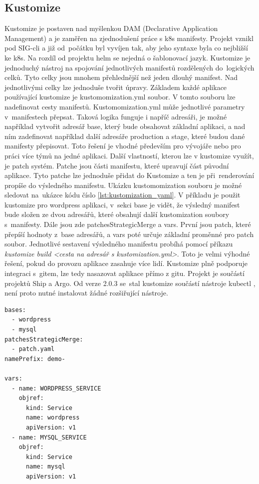 \subsection{Kustomize}
Kustomize je postaven nad myšlenkou DAM (Declarative Application Management) \cite{k8s_DAM} a je zaměřen na zjednodušení práce s k8s manifesty. Projekt vznikl pod SIG-cli \cite{kustomize_sig} a již od počátku byl vyvíjen tak, aby jeho syntaxe byla co nejbližší ke k8s. Na rozdíl od projektu helm se nejedná o šablonovací jazyk. Kustomize je jednoduchý nástroj na spojování jednotlivých manifestů rozdělených do logických celků. Tyto celky jsou mnohem přehlednější než jeden dlouhý manifest. Nad jednotlivými celky lze jednoduše tvořit úpravy. Základem každé aplikace používající kustomize je kustomomization.yml soubor. V tomto souboru lze nadefinovat cesty manifestů. Kustomomization.yml může jednotlivé parametry v manifestech přepsat. Taková logika funguje i napříč adresáři, je možné například vytvořit adresář base, který bude obsahovat základní aplikaci, a nad ním zadefinovat například další adresáře production a stage, které budou dané manifesty přepisovat. Toto řešení je vhodné především pro vývojáře nebo pro práci více týmů na jedné aplikaci. Další vlastností, kterou lze v kustomize využít, je patch systém. Patche jsou části manifestu, které upravují část původní aplikace. Tyto patche lze jednoduše přidat do Kustomize a ten je při renderování propíše do výsledného manifestu. Ukázku kustomomization souboru je možné sledovat na ukázce kódu číslo \ref{lst:kustomization_yaml}. V příkladu je použit kustomize pro wordpress aplikaci, v sekci base je vidět, že výsledný manifest bude složen ze dvou adresářů, které obsahují další kustomization soubory s manifesty. Dále jsou zde patchesStrategicMerge a vars. První jsou patch, které přepíší hodnoty z base adresářů, a vars poté určuje základní proměnné pro patch soubor. Jednotlivé sestavení výsledného manifestu probíhá pomocí příkazu \textit{kustomize build <cesta na adresář s kustomization.yml>}. Toto je velmi výhodné řešení, pokud do provozu aplikace zasahuje více lidí. Kustomize plně podporuje integraci s gitem, lze tedy nasazovat aplikace přímo z gitu. Projekt je součástí projektů Ship a Argo. Od verze 2.0.3 se stal kustomize součástí nástroje kubectl \cite{kustomize_kubelet}, není proto nutné instalovat žádné rozšiřující nástroje.

\begin{lstlisting}[caption={Kustomization.yml soubor, zdroj: \cite{kustomization_yaml}},label={lst:kustomization_yaml}]
bases:
  - wordpress
  - mysql
patchesStrategicMerge:
  - patch.yaml
namePrefix: demo-

vars:
  - name: WORDPRESS_SERVICE
    objref:
      kind: Service
      name: wordpress
      apiVersion: v1
  - name: MYSQL_SERVICE
    objref:
      kind: Service
      name: mysql
      apiVersion: v1

\end{lstlisting}

